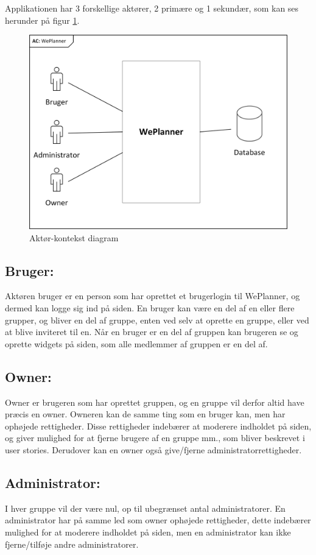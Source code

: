 Applikationen har 3 forskellige aktører, 2 primære og 1 sekundær, som kan ses herunder på figur \ref{fig:aktor_konteks}.
\begin{figure}[H]
  \includegraphics[width=\linewidth]{02_Kravspecifikation/Images/Aktor-kontekst_diagram.png}
  \caption{Aktør-kontekst diagram}
  \label{fig:aktor_konteks}
\end{figure}

\subsection{Bruger:}
Aktøren bruger er en person som har oprettet et brugerlogin til WePlanner, og dermed kan logge sig ind på siden. En bruger kan være en del af en eller flere grupper, og bliver en del af gruppe, enten ved selv at oprette en gruppe, eller ved at blive inviteret til en. Når en bruger er en del af gruppen kan brugeren se og oprette widgets på siden, som alle medlemmer af gruppen er en del af. 

\subsection{Owner:} 
Owner er brugeren som har oprettet gruppen, og en gruppe vil derfor altid have præcis en owner. Owneren kan de samme ting som en bruger kan, men har ophøjede rettigheder. Disse rettigheder indebærer at moderere indholdet på siden, og giver mulighed for at fjerne brugere af en gruppe mm., som bliver beskrevet i user stories. Derudover kan en owner også give/fjerne administratorrettigheder.

\subsection{Administrator:}
I hver gruppe vil der være nul, op til ubegrænset antal administratorer. En administrator har på samme led som owner ophøjede rettigheder, dette indebærer mulighed for at moderere indholdet på siden, men en administrator kan ikke fjerne/tilføje andre administratorer.

